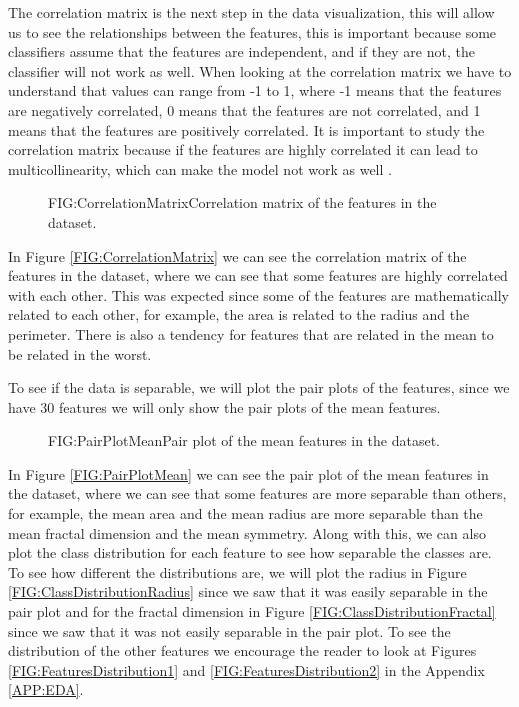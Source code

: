 The correlation matrix is the next step in the data visualization, this will allow us to see the relationships between the features, this is important because some classifiers assume that the features are independent, and if they are not, the classifier will not work as well. When looking at the correlation matrix we have to understand that values can range from -1 to 1, where -1 means that the features are negatively correlated, 0 means that the features are not correlated, and 1 means that the features are positively correlated. It is important to study the correlation matrix because if the features are highly correlated it can lead to multicollinearity, which can make the model not work as well \cite{belsley_regression_2005}.

\begin{figure}[Correlation Matrix]{FIG:CorrelationMatrix}{Correlation matrix of the features in the dataset.}
\end{figure}

In Figure \ref{FIG:CorrelationMatrix} we can see the correlation matrix of the features in the dataset, where we can see that some features are highly correlated with each other. This was expected since some of the features are mathematically related to each other, for example, the area is related to the radius and the perimeter. There is also a tendency for features that are related in the mean to be related in the worst.

To see if the data is separable, we will plot the pair plots of the features, since we have 30 features we will only show the pair plots of the mean features.

\begin{figure}[Pair Plot of the Mean Features]{FIG:PairPlotMean}{Pair plot of the mean features in the dataset.}

\end{figure}

In Figure \ref{FIG:PairPlotMean} we can see the pair plot of the mean features in the dataset, where we can see that some features are more separable than others, for example, the mean area and the mean radius are more separable than the mean fractal dimension and the mean symmetry. Along with this, we can also plot the class distribution for each feature to see how separable the classes are. To see how different the distributions are, we will plot the radius in Figure \ref{FIG:ClassDistributionRadius} since we saw that it was easily separable in the pair plot and for the fractal dimension in Figure \ref{FIG:ClassDistributionFractal} since we saw that it was not easily separable in the pair plot. To see the distribution of the other features we encourage the reader to look at Figures \ref{FIG:FeaturesDistribution1} and \ref{FIG:FeaturesDistribution2} in the Appendix \ref{APP:EDA}.


